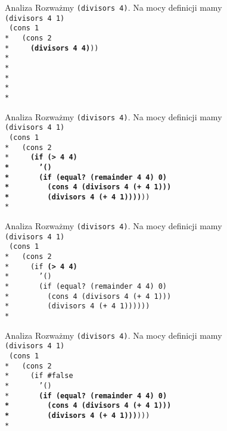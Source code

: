 \begin{frame}{Analiza}
  Rozważmy \texttt{(divisors 4)}. Na mocy definicji mamy\\
  \texttt{(divisors 4 1)}\\
  \texttt{
(cons 1 \\*
\ \ (cons 2 \\*
\ \ \ \ \textbf{(divisors 4 4)}))\\*
\ \\*
\ \\*
\ \\*
\ \\*
  }
\end{frame}


\begin{frame}{Analiza}
  Rozważmy \texttt{(divisors 4)}. Na mocy definicji mamy\\
  \texttt{(divisors 4 1)}\\
  \texttt{
(cons 1 \\*
\ \ (cons 2 \\*
\ \ \ \ \textbf{(if (> 4 4)\\*
\ \ \ \ \ \ '()\\*
\ \ \ \ \ \ (if (equal?\ (remainder 4 4) 0)\\*
\ \ \ \ \ \ \ \ (cons 4 (divisors 4 (+ 4 1)))\\*
\ \ \ \ \ \ \ \ (divisors 4 (+ 4 1))))}))\\*
  }
\end{frame}

\begin{frame}{Analiza}
  Rozważmy \texttt{(divisors 4)}. Na mocy definicji mamy\\
  \texttt{(divisors 4 1)}\\
  \texttt{
(cons 1 \\*
\ \ (cons 2 \\*
\ \ \ \ (if \textbf{(> 4 4)}\\*
\ \ \ \ \ \ '()\\*
\ \ \ \ \ \ (if (equal?\ (remainder 4 4) 0)\\*
\ \ \ \ \ \ \ \ (cons 4 (divisors 4 (+ 4 1)))\\*
\ \ \ \ \ \ \ \ (divisors 4 (+ 4 1))))))\\*
  }
\end{frame}

\begin{frame}{Analiza}
  Rozważmy \texttt{(divisors 4)}. Na mocy definicji mamy\\
  \texttt{(divisors 4 1)}\\
  \texttt{
(cons 1 \\*
\ \ (cons 2 \\*
\ \ \ \ (if \#false\\*
\ \ \ \ \ \ '()\\*
\ \ \ \ \ \ \textbf{(if (equal?\ (remainder 4 4) 0)\\*
\ \ \ \ \ \ \ \ (cons 4 (divisors 4 (+ 4 1)))\\*
\ \ \ \ \ \ \ \ (divisors 4 (+ 4 1)))})))\\*
  }
\end{frame}


